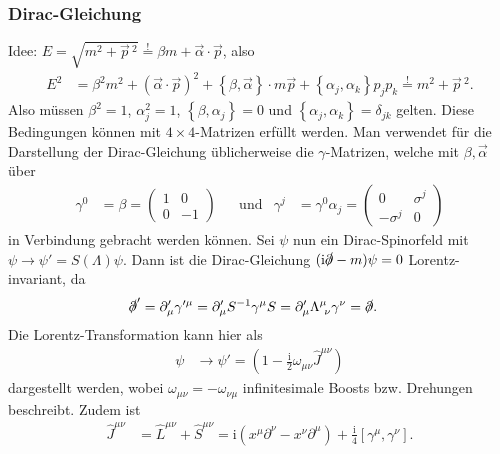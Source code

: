 \documentclass[english, parskip=full]{scrreport}
\newcommand{\kla}{}
\newcommand{\klam}{}
\newcommand{\klammer}{}
\newcommand{\tecxt}{}
\renewcommand{\i}{\text{i}}
\begin{document}
\subsubsection{Dirac-Gleichung}
Idee: $E=\sqrt{m^2 + \vec{p}\,^2}\overset{!}{=} \beta m + \vec{\alpha}\cdot\vec{p}$, also
\begin{align}
E^2 &= \beta^2m^2 + \kla\left( \vec{\alpha}\cdot\vec{p} \right)^2 + \klammer\left\{ \beta, \vec{\alpha} \right\}\cdot m\vec{p} + \klammer\left\{ \alpha_j, \alpha_k \right\}p_jp_k \overset{!}{=} m^2 + \vec{p}\,^2.
\end{align}
Also müssen $\beta^2 = 1$, $\alpha_j^2 = 1$, $\klammer\left\{ \beta, \alpha_j \right\} = 0$ und $\klammer\left\{ \alpha_j, \alpha_k \right\}=\delta_{jk}$ gelten.
Diese Bedingungen können mit $4\times 4$-Matrizen erfüllt werden.
Man verwendet für die Darstellung der Dirac-Gleichung üblicherweise die $\gamma$-Matrizen, welche mit $\beta,\vec{\alpha}$ über
\begin{align}
\gamma^0 &= \beta = \begin{pmatrix}
1 & 0 \\ 0 & -1
\end{pmatrix} &&\tecxt\text{und} & \gamma^j &= \gamma^0\alpha_j = \begin{pmatrix}
0 & \sigma^j \\ -\sigma^j & 0
\end{pmatrix}
\end{align}
in Verbindung gebracht werden können.
Sei $\psi$ nun ein Dirac-Spinorfeld mit $\psi\rightarrow\psi ' = S(\Lambda) \psi$.
Dann ist die Dirac-Gleichung $(\i\slashed{\partial} - m)\psi=0$ Lorentz-invariant, da
\begin{align}
\slashed{\partial}' &= \partial_\mu'\gamma'^\mu = \partial_\mu'S^{-1}\gamma^\mu S = \partial_\mu'\Lambda^\mu_{\ \nu}\gamma^\nu = \slashed{\partial}.
\end{align}
Die Lorentz-Transformation kann hier als
\begin{align}
\psi &\rightarrow\psi' = \kla\left( 1 - \frac{\i}{2}\omega_{\mu\nu}\hat{J}^{\mu\nu} \right) 
\end{align}
dargestellt werden, wobei $\omega_{\mu\nu} = -\omega_{\nu\mu}$ infinitesimale Boosts bzw. Drehungen beschreibt.
Zudem ist
\begin{align}
\hat{J}^{\mu\nu} &= \hat{L}^{\mu\nu} + \hat{S}^{\mu\nu} = \i\kla\left( x^\mu\partial^\nu - x^\nu\partial^\mu  \right) + \frac{\i}{4}\klam\left[ \gamma^\mu, \gamma^\nu \right].
\end{align}
\end{document}
